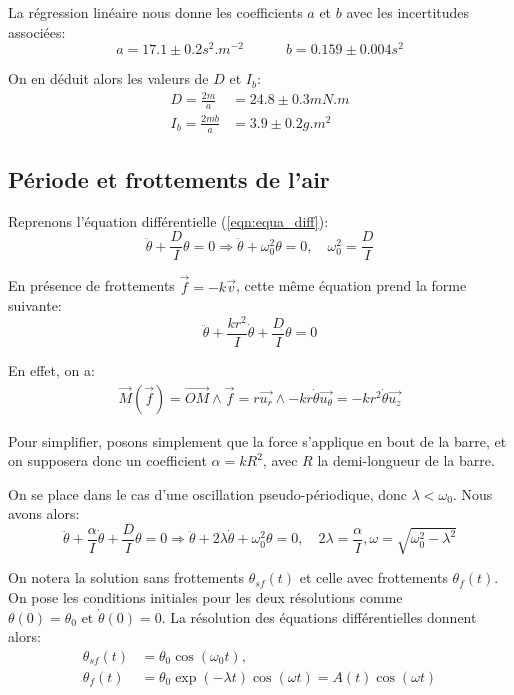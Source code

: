 \documentclass[11pt]{article}
\newcommand{\ut}{\vec{u_\theta}}
\newcommand{\ur}{\vec{u_r}}
\newcommand{\uz}{\vec{u_z}}
\begin{document}
La régression linéaire nous donne les coefficients $a$ et $b$ avec les incertitudes associées:
\begin{equation}
    a = 17.1 \pm 0.2 s^2.m^{-2} \quad \quad \quad b = 0.159 \pm 0.004 s^2
\end{equation}

On en déduit alors les valeurs de $D$ et $I_b$:
\begin{align*}
    D = \frac{2m}{a} & = 24.8 \pm 0.3 mN.m \\
    I_b = \frac{2mb}{a} & = 3.9 \pm 0.2 g.m^2
\end{align*}


\break
\subsection{Période et frottements de l'air}
\label{section:periode}
Reprenons l'équation différentielle (\ref{eqn:equa_diff}):
\begin{equation}
    \ddot \theta + \frac{D}{I}\theta = 0 \Rightarrow \ddot \theta + \omega_0^2 \theta = 0, \quad \omega_0^2 = \frac{D}{I}
    \label{eqn:sans_frottements}
\end{equation}


En présence de frottements $\vec{f} = -k \vec{v}$, cette même équation prend la forme suivante:
\begin{equation}
    \ddot \theta + \frac{k r^2}{I} \dot \theta + \frac{D}{I}\theta = 0
\end{equation}

En effet, on a:
\begin{align}
    \vec{M}(\vec{f}) = \vec{OM} \wedge \vec{f} = r\ur \wedge -k r \dot \theta \ut = -k r^2 \dot \theta \uz
\end{align}

Pour simplifier, posons simplement que la force s'applique en bout de la barre, et on supposera donc un coefficient 
$\alpha = k R^2$, avec $R$ la demi-longueur de la barre.

On se place dans le cas d'une oscillation pseudo-périodique, donc $\lambda < \omega_0$. Nous avons alors:
\begin{equation}
    \ddot \theta + \frac{\alpha}{I} \dot \theta + \frac{D}{I}\theta = 0 \Rightarrow \ddot \theta + 2\lambda \dot \theta + \omega_0^2\theta = 0, \quad 2\lambda = \frac{\alpha}{I}, \omega = \sqrt{\omega_0^2 - \lambda^2} 
    \label{eqn:avec_frottements}
\end{equation}

On notera la solution sans frottements $\theta_{sf}(t)$ et celle avec frottements $\theta_{f}(t)$. On pose
les conditions initiales pour les deux résolutions comme $\theta(0) = \theta_0 \text{ et } \dot \theta(0) = 0$. La résolution des équations 
différentielles donnent alors:
\begin{align}
    \theta_{sf}(t) &= \theta_0 \cos(\omega_0 t), \quad  \\
    \theta_{f}(t) &= \theta_0 \exp(-\lambda t)\cos(\omega t) = A(t) \cos(\omega t)
\end{align}
\end{document}
